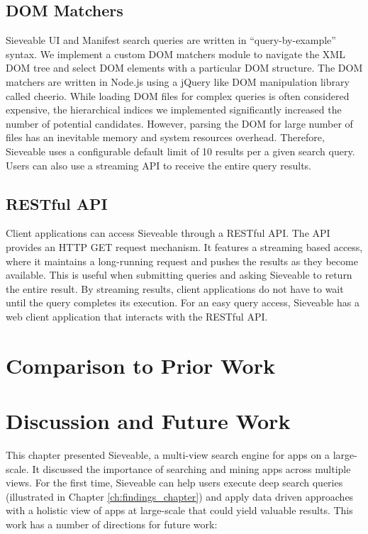 \subsection{DOM Matchers}

Sieveable UI and Manifest search queries are written in ``query-by-example'' syntax.
We implement a custom DOM matchers module to navigate the XML DOM tree and select DOM elements with a particular DOM structure.
The DOM matchers are written in Node.js using a jQuery like DOM manipulation library called cheerio.
While loading DOM files for complex queries is often considered expensive, the hierarchical indices we implemented significantly increased the number of potential candidates. 
However, parsing the DOM for large number of files has an inevitable memory and system resources overhead.
Therefore, Sieveable uses a configurable default limit of 10 results per a given search query.
Users can also use a streaming API to receive the entire query results.

\subsection{RESTful API}
Client applications can access Sieveable through a RESTful API. The API provides an HTTP GET request mechanism. It features a streaming based access, where it maintains a long-running request and pushes the results as they become available.
This is useful when submitting queries and asking Sieveable to return the entire result.
By streaming results, client applications do not have to wait until the query completes its execution. 
For an easy query access, Sieveable has a web client application that interacts with the RESTful API.

\section{Comparison to Prior Work}

\section{Discussion and Future Work}
This chapter presented Sieveable, a multi-view search engine for apps on a large-scale.
It discussed the importance of searching and mining apps across multiple views.
For the first time, Sieveable can help users execute deep search queries (illustrated in Chapter \ref{ch:findings_chapter}) and apply data driven approaches with a holistic view of apps at large-scale that could yield valuable results.
This work has a number of directions for future work:

